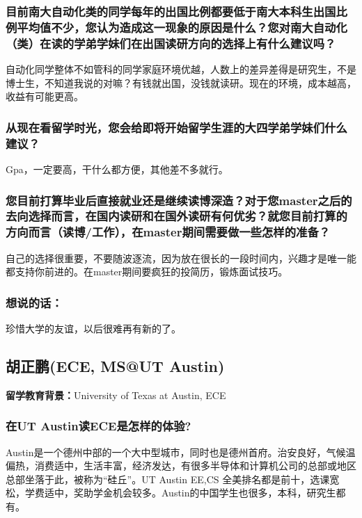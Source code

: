\documentclass[a4paper,UTF8]{book}
\begin{document}
    \subsubsection*{目前南大自动化类的同学每年的出国比例都要低于南大本科生出国比例平均值不少，您认为造成这一现象的原因是什么？您对南大自动化（类）在读的学弟学妹们在出国读研方向的选择上有什么建议吗？}
    自动化同学整体不如管科的同学家庭环境优越，人数上的差异差得是研究生，不是博士生，不知道我说的对嘛？有钱就出国，没钱就读研。现在的环境，成本越高，收益有可能更高。

    \subsubsection*{从现在看留学时光，您会给即将开始留学生涯的大四学弟学妹们什么建议？}
    Gpa，一定要高，干什么都方便，其他差不多就行。

    \subsubsection*{您目前打算毕业后直接就业还是继续读博深造？对于您master之后的去向选择而言，在国内读研和在国外读研有何优劣？就您目前打算的方向而言（读博/工作），在master期间需要做一些怎样的准备？}
    自己的选择很重要，不要随波逐流，因为放在很长的一段时间内，兴趣才是唯一能都支持你前进的。在master期间要疯狂的投简历，锻炼面试技巧。

    \subsubsection{想说的话：}
    珍惜大学的友谊，以后很难再有新的了。



\clearpage
\subsection{胡正鹏(ECE, MS@UT Austin)}
    \textbf{留学教育背景：}University of Texas at Austin, ECE

    \subsubsection*{在UT Austin读ECE是怎样的体验?}
    Austin是一个德州中部的一个大中型城市，同时也是德州首府。治安良好，气候温偏热，消费适中，生活丰富，经济发达，有很多半导体和计算机公司的总部或地区总部坐落于此，被称为“硅丘”。UT Austin EE,CS 全美排名都是前十，选课宽松，学费适中，奖助学金机会较多。Austin的中国学生也很多，本科，研究生都有。
\end{document}
